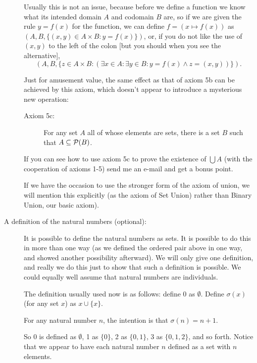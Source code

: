 \documentclass[12pt]{article}
\begin{document}
\begin{description}
Usually this is not an issue, because before we define a function we know what its intended domain $A$ and codomain $B$ are, so if we are given the rule $y=f(x)$ for the function, we can define
$f = (x \mapsto f(x))$ as $(A,B,\{(x,y) \in A \times B:y=f(x)\})$, or, if you do not like the use of $(x,y)$ to the left of the colon [but you should when you see the alternative], $$(A,B,\{z \in A \times B:(\exists x \in A:\exists y \in B:y=f(x) \wedge z = (x,y))\}).$$

Just for amusement value, the same effect as that of axiom 5b can be achieved by this axiom, which doesn't appear to introduce a mysterious new operation:

\begin{description}

\item[Axiom 5c:]  For any set $A$ all of whose elements are sets, there is a set $B$ such that $A \subseteq {\cal P}(B)$.

\end{description}

If you can see how to use axiom 5c to prove the existence of $\bigcup A$ (with the cooperation of axioms 1-5) send me an e-mail and get a bonus point.



If we have the occasion to use the stronger form of the axiom of union, we will mention this explicitly (as the axiom of Set Union) rather than Binary Union, our basic axiom).






\item[A definition of the natural numbers (optional):]

It is possible to define the natural numbers as sets.  It is possible to do this in more than one way (as we defined the ordered pair above in one way, and showed another possibility afterward).  We will only give one definition, and really we do this just to show that such a definition is possible.  We could equally well assume that natural numbers are individuals.

The definition usually used now is as follows:  define 0 as $\emptyset$.  Define $\sigma(x)$ (for any set $x$) as $x \cup \{x\}$.

For any natural number $n$, the intention is that $\sigma(n)=n+1$.

So 0 is defined as $\emptyset$, 1 as $\{0\}$, 2 as $\{0,1\}$, 3 as $\{0,1,2\}$, and so forth.   Notice that we appear to have each natural number $n$ defined as a set with $n$ elements.


\end{description}
\end{document}
